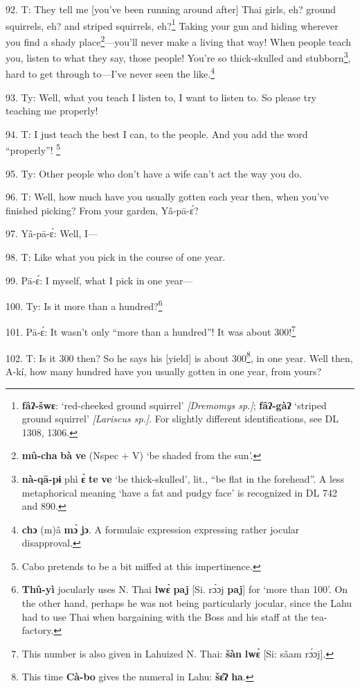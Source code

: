 92. T: They tell me [you've been running around after] Thai girls, eh? ground
squirrels, eh? and striped squirrels, eh?\footnote{\textbf{fâʔ-šwɛ}: `red-cheeked ground squirrel' \textit{[Dremomys sp.]}; \textbf{fâʔ-gàʔ} `striped ground squirrel' \textit{[Lariscus sp.]}. For slightly different identifications, see DL 1308, 1306.} Taking your gun and hiding wherever
you find a shady place\footnote{\textbf{mû-cha} \textbf{bà} \textbf{ve} (Nspec + V) `be shaded from the sun'.}---you'll never make a living that way! When people
teach you, listen to what they say, those people! You're so thick-skulled and
stubborn\footnote{\textbf{nà-qā-pɨ} phì \textbf{ɛ̀} \textbf{te} \textbf{ve} `be thick-skulled', lit., ``be flat in the forehead''. A less metaphorical meaning `have a fat and pudgy face' is recognized in DL 742 and 890.}, hard to get through to---I've never seen the like.\footnote{\textbf{chɔ} (m)â \textbf{mɔ̀} \textbf{jɔ}. A formulaic expression expressing rather jocular disapproval.}

93. Ty: Well, what you teach I listen to, I want to listen to. So please try
teaching me properly!

94. T: I just teach the best I can, to the people. And you add the word ``properly''!
\footnote{Cabo pretends to be a bit miffed at this impertinence.}

95. Ty: Other people who don't have a wife can't act the way you do.

96. T: Well, how much have you usually gotten each year then, when you've finished
picking? From your garden, Yâ-pā-ɛ́?

97. Yâ-pā-ɛ́: Well, I---

98. T: Like what you pick in the course of one year.

99. Pā-ɛ́: I myself, what I pick in one year---

100. Ty: Is it more than a hundred?\footnote{\textbf{Thû-yì} jocularly uses N. Thai \textbf{lwɛ̀} \textbf{paj} [Si. rɔ́ɔj \textbf{paj}] for `more than 100'. On the other hand, perhaps he was not being particularly jocular, since the Lahu had to use Thai when bargaining with the Boss and his staff at the tea-factory.}

101. Pā-ɛ́: It wasn't only ``more than a hundred''! It was about 300!\footnote{This number is also given in Lahuized N. Thai: \textbf{šàn} \textbf{lwɛ̀} [Si: sǎam rɔ́ɔj].}

102. T: Is it 300 then? So he says his [yield] is about 300\footnote{This time \textbf{Cà-bo} gives the numeral in Lahu: \textbf{šɛ̂ʔ} \textbf{ha}.}, in one year.
Well then, A-kí, how many hundred have you usually gotten in one year, from yours?

